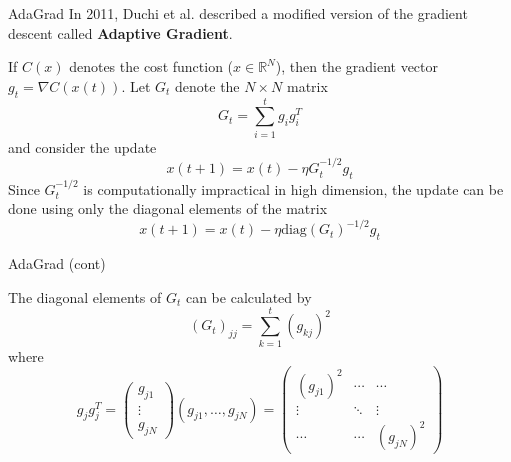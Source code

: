 \documentclass{beamer}
\begin{document}
\begin{frame}{AdaGrad}
	In 2011, Duchi et al. described a modified version of the gradient descent called \textbf{Adaptive Gradient}. 
	
	If $C(x)$ denotes the cost function ($x\in \mathbb{R}^N$), then the gradient vector $g_t= \nabla C(x(t))$.  Let $G_t$ denote the $N \times N$ matrix
	\begin{equation*}
		G_t = \sum_{i=1}^{t} g_i g_i^T
	\end{equation*}
	and consider the update
	\begin{equation*}
		x(t+1)=x(t)- \eta G_t^{-1/2} g_t
	\end{equation*}
Since $G_t^{-1/2}$ is computationally impractical in high dimension, the update can be done using only the diagonal elements of the matrix
	\begin{equation*}
	x(t+1)=x(t)- \eta \text{diag}(G_t)^{-1/2} g_t
\end{equation*}


\end{frame}

\begin{frame}{AdaGrad (cont)}
	
	
	The diagonal elements of $G_t$ can be calculated by
	\begin{equation*}
		(G_t)_{jj}= \sum_{k=1}^t (g_{kj})^2
	\end{equation*}
where 
\begin{equation*}
	g_jg_j^T= \begin{pmatrix}
		g_{j1} \\
	\vdots\\
g_{jN}
\end{pmatrix}
(g_{j1},\ldots, g_{jN}) =
\begin{pmatrix}
	(g_{j1})^2 & \cdots & \cdots \\
	\vdots & \ddots & \vdots \\
	\cdots & \cdots & (g_{jN})^2
\end{pmatrix}
\end{equation*}
\end{frame}
\end{document}
